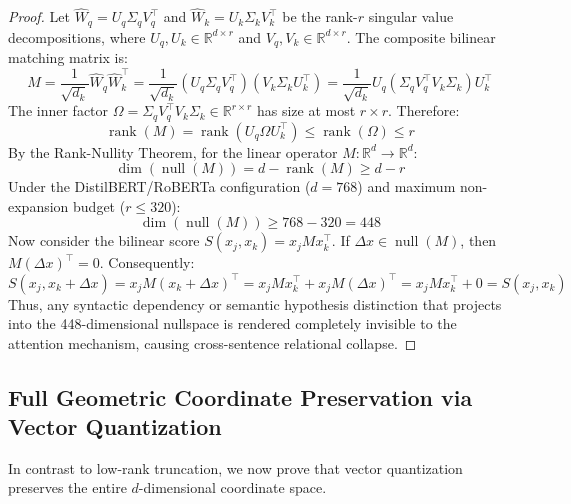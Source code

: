 \documentclass{article}
\begin{document}
\begin{proof}
Let $\hat{W}_q = U_q \Sigma_q V_q^\top$ and $\hat{W}_k = U_k \Sigma_k V_k^\top$ be the rank-$r$ singular value decompositions, where $U_q, U_k \in \mathbb{R}^{d \times r}$ and $V_q, V_k \in \mathbb{R}^{d \times r}$.
The composite bilinear matching matrix is:
\begin{equation}
    M = \frac{1}{\sqrt{d_k}} \hat{W}_q \hat{W}_k^\top = \frac{1}{\sqrt{d_k}} (U_q \Sigma_q V_q^\top) (V_k \Sigma_k U_k^\top) = \frac{1}{\sqrt{d_k}} U_q (\Sigma_q V_q^\top V_k \Sigma_k) U_k^\top
\end{equation}
The inner factor $\Omega = \Sigma_q V_q^\top V_k \Sigma_k \in \mathbb{R}^{r \times r}$ has size at most $r \times r$. Therefore:
\begin{equation}
    \operatorname{rank}(M) = \operatorname{rank}\left(U_q \Omega U_k^\top\right) \le \operatorname{rank}(\Omega) \le r
\end{equation}
By the Rank-Nullity Theorem, for the linear operator $M: \mathbb{R}^d \to \mathbb{R}^d$:
\begin{equation}
    \operatorname{dim}(\operatorname{null}(M)) = d - \operatorname{rank}(M) \ge d - r
\end{equation}
Under the DistilBERT/RoBERTa configuration ($d=768$) and maximum non-expansion budget ($r \le 320$):
\begin{equation}
    \operatorname{dim}(\operatorname{null}(M)) \ge 768 - 320 = 448
\end{equation}
Now consider the bilinear score $S(x_j, x_k) = x_j M x_k^\top$. If $\Delta x \in \operatorname{null}(M)$, then $M (\Delta x)^\top = 0$. Consequently:
\begin{equation}
    S(x_j, x_k + \Delta x) = x_j M (x_k + \Delta x)^\top = x_j M x_k^\top + x_j M (\Delta x)^\top = x_j M x_k^\top + 0 = S(x_j, x_k)
\end{equation}
Thus, any syntactic dependency or semantic hypothesis distinction that projects into the 448-dimensional nullspace is rendered completely invisible to the attention mechanism, causing cross-sentence relational collapse.
\end{proof}

\subsection{Full Geometric Coordinate Preservation via Vector Quantization}
In contrast to low-rank truncation, we now prove that vector quantization preserves the entire $d$-dimensional coordinate space.
\end{document}
